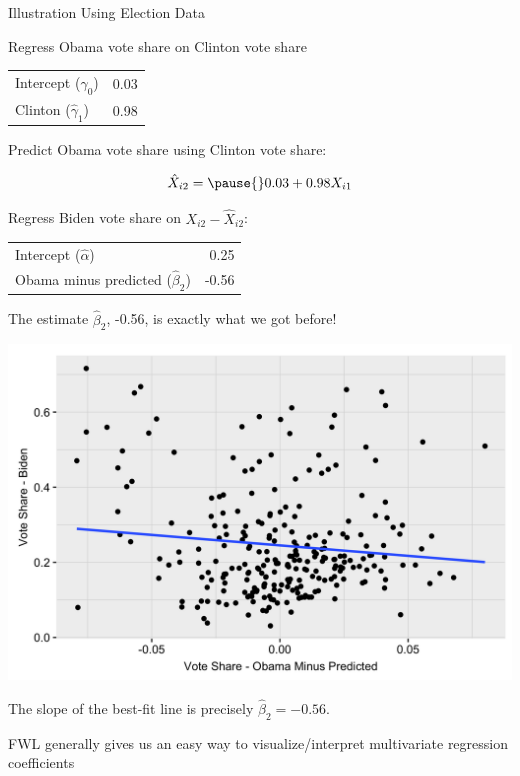 \documentclass[11pt,english,handout]{beamer}
\newenvironment{wideitemize}{\itemize\addtolength{\itemsep}{10pt}}{\enditemize}
\begin{document}
	\begin{frame}{Illustration Using Election Data}
	\begin{wideitemize}
		\item
		Regress Obama vote share on Clinton vote share
		\begin{tabular}{lr}
		Intercept ($\hat\gamma_0$) & 0.03 \\
		Clinton ($\hat\gamma_1$) & 0.98
		\end{tabular}
		
		\pause
		\item
		Predict Obama vote share using Clinton vote share:
		
		$$\hat{X}_{i2} = \pause{} 0.03 + 0.98 X_{i1} $$
		
\vspace{-0.5cm}
		\pause
		\item
		Regress Biden vote share on $X_{i2} - \hat X_{i2} $:
		
		\begin{tabular}{lr}
			Intercept ($\hat\alpha$) & 0.25 \\
			Obama minus predicted ($\hat\beta_2$) & -0.56
		\end{tabular}
	
	\item
	The estimate $\hat\beta_2$, -0.56, is exactly what we got before!				
	\end{wideitemize}	
	\end{frame}
	
	
	\begin{frame}
		\centering
		\includegraphics[width = 0.7\linewidth]{biden-obama-residuals}

		\begin{wideitemize}
			\item
			The slope of the best-fit line is precisely $\hat\beta_2 = -0.56$.
			\item FWL generally gives us an easy way to visualize/interpret multivariate regression coefficients 
		\end{wideitemize}
	\end{frame}
	
\end{document}
